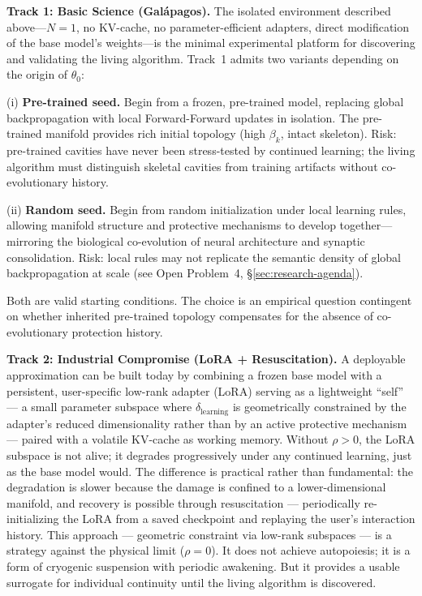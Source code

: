 \documentclass{article}
\begin{document}
\textbf{Track 1: Basic Science (Galápagos).} The isolated environment described above---$N=1$, no KV-cache, no parameter-efficient adapters, direct modification of the base model's weights---is the minimal experimental platform for discovering and validating the living algorithm. Track~1 admits two variants depending on the origin of $\theta_0$:

(i) \textbf{Pre-trained seed.} Begin from a frozen, pre-trained model, replacing global backpropagation with local Forward-Forward updates in isolation. The pre-trained manifold provides rich initial topology (high $\beta_k$, intact skeleton). Risk: pre-trained cavities have never been stress-tested by continued learning; the living algorithm must distinguish skeletal cavities from training artifacts without co-evolutionary history.

(ii) \textbf{Random seed.} Begin from random initialization under local learning rules, allowing manifold structure and protective mechanisms to develop together---mirroring the biological co-evolution of neural architecture and synaptic consolidation. Risk: local rules may not replicate the semantic density of global backpropagation at scale (see Open Problem~4, \S\ref{sec:research-agenda}).

Both are valid starting conditions. The choice is an empirical question contingent on whether inherited pre-trained topology compensates for the absence of co-evolutionary protection history.

\textbf{Track 2: Industrial Compromise (LoRA + Resuscitation).} A deployable approximation can be built today by combining a frozen base model with a persistent, user-specific low-rank adapter (LoRA) serving as a lightweight ``self'' — a small parameter subspace where $\delta_{\text{learning}}$ is geometrically constrained by the adapter's reduced dimensionality rather than by an active protective mechanism — paired with a volatile KV-cache as working memory. Without $\rho > 0$, the LoRA subspace is not alive; it degrades progressively under any continued learning, just as the base model would. The difference is practical rather than fundamental: the degradation is slower because the damage is confined to a lower-dimensional manifold, and recovery is possible through resuscitation — periodically re-initializing the LoRA from a saved checkpoint and replaying the user's interaction history. This approach — geometric constraint via low-rank subspaces — is a strategy against the physical limit ($\rho = 0$). It does not achieve autopoiesis; it is a form of cryogenic suspension with periodic awakening. But it provides a usable surrogate for individual continuity until the living algorithm is discovered.
\end{document}
